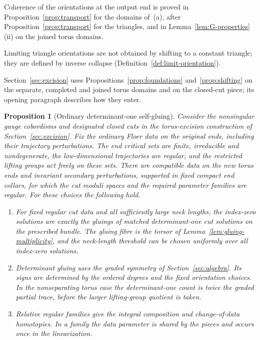 \documentclass[11pt]{amsart}
\newtheorem{proposition}[theorem]{Proposition}
\theoremstyle{definition}
\theoremstyle{remark}
\theoremstyle{plain}
\numberwithin{equation}{section}
\begin{document}
Coherence of the orientations at the output end is proved in Proposition~\ref{prop:transport} for
the domains of~(a), after Proposition~\ref{prop:transport} for the triangles, and in
Lemma~\ref{lem:G-properties}(ii) on the joined torus domains.

Limiting triangle orientations are not obtained by shifting to a constant triangle; they are defined
by inverse collapse (Definition~\ref{def:limit-orientation}).

Section~\ref{sec:excision} uses Propositions~\ref{prop:foundations} and~\ref{prop:shifting} on the
separate, completed and joined torus domains and on the closed-cut piece; its opening paragraph
describes how they enter.

\begin{proposition}[Ordinary determinant-one self-gluing]
\label{prop:selfgluing}
Consider the nonsingular gauge cobordisms and designated closed cuts
in the torus-excision construction of Section~\ref{sec:excision}.
Fix the ordinary Floer data on the original ends, including their
trajectory perturbations. The end critical sets are finite,
irreducible and nondegenerate, the low-dimensional trajectories are
regular, and the restricted lifting groups act freely on these sets.
There are compatible data on the new torus ends and invariant
secondary perturbations, supported in fixed compact end collars,
for which the cut moduli spaces and the required parameter families
are regular. For these choices the following hold.
\begin{enumerate}[label=(\alph*)]
\item For fixed regular cut data and all sufficiently large neck
lengths, the index-zero solutions are exactly the gluings of matched
determinant-one cut solutions on the prescribed bundle. The gluing
fibre is the torsor of Lemma~\ref{lem:gluing-multiplicity}, and the neck-length threshold can be chosen uniformly over all index-zero solutions.
\item Determinant gluing uses the graded symmetry of
Section~\ref{sec:algebra}. Its signs are determined by the ordered
degrees and the fixed orientation choices. In the nonseparating
torus case the determinant-one count is twice the graded partial
trace, before the larger lifting-group quotient is taken.
\item Relative regular families give the integral composition and
change-of-data homotopies. In a family the data parameter is shared
by the pieces and occurs once in the linearization.
\end{enumerate}
\end{proposition}
\end{document}
